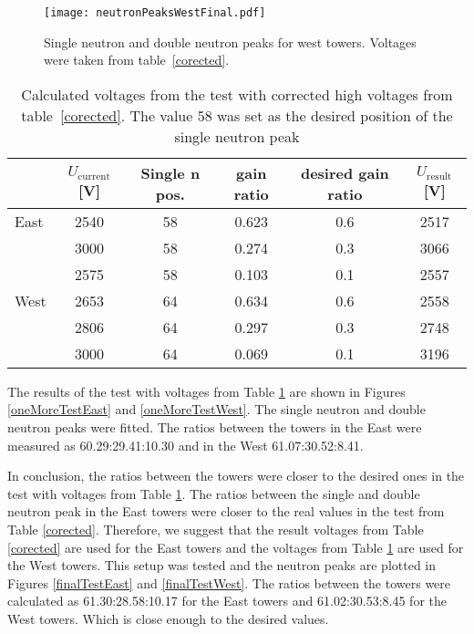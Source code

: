\documentclass[a4paper,10pt]{report}
\begin{document}
\begin{figure}[htb]
\begin{center}
\texttt{[image: neutronPeaksWestFinal.pdf]}
\end{center}
\caption{Single neutron and double neutron peaks for west towers.
Voltages were taken from table~\ref{corected}.}
\label{westThird}
\end{figure}

\begin{table}[htb] 
\caption{Calculated voltages from the test with corrected high voltages from table~\ref{corected}.
The value 58 was set as the desired position of the single neutron peak}
\label{thirdCalib}
\begin{center}
\begin{tabular}{lccccc}
 \toprule
 &$U_\text{current}$[V]&Single n pos.&gain ratio&desired gain ratio&$U_\text{result}$[V]\\
\midrule
East  &2540  &58 &0.623  &0.6 &2517 \\
      &3000  &58 &0.274  &0.3 &3066 \\
      &2575  &58 &0.103	&0.1 &2557 \\
\midrule
West  &2653  &64 &0.634 &0.6 &2558 \\
      &2806  &64 &0.297 &0.3 &2748 \\
      &3000  &64 &0.069 &0.1 &3196 \\
\bottomrule
\end{tabular}
\end{center}
\end{table}

The results of the test with voltages from Table \ref{thirdCalib} are shown in
Figures \ref{oneMoreTestEast} and \ref{oneMoreTestWest}\@. The single neutron and double
neutron peaks were fitted. The ratios between the towers in the East were measured as
60.29:29.41:10.30 and in the West 61.07:30.52:8.41. 

In conclusion, the ratios between the towers were closer to the desired ones in the
test with voltages from Table \ref{thirdCalib}. The ratios between the single and double
neutron peak in the East towers were closer to the real values in the test from
Table \ref{corected}. Therefore, we suggest that the result voltages from Table \ref{corected}
are used for the East towers and the voltages from Table \ref{thirdCalib} are used for the
West towers. This setup was tested and the neutron peaks are plotted in Figures \ref{finalTestEast}
and \ref{finalTestWest}. The ratios between the towers were calculated as
61.30:28.58:10.17 for the East towers and 61.02:30.53:8.45 for the West towers.
Which is close enough to the desired values.
\end{document}
